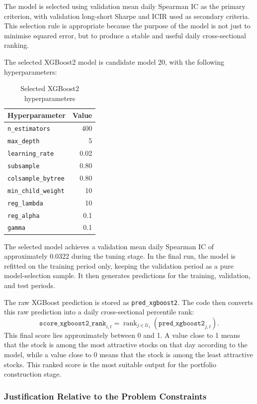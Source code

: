 \documentclass[12pt]{article}
\begin{document}
The model is selected using validation mean daily Spearman IC as the primary criterion, with validation long-short Sharpe and ICIR used as secondary criteria. This selection rule is appropriate because the purpose of the model is not just to minimise squared error, but to produce a stable and useful daily cross-sectional ranking.

The selected XGBoost2 model is candidate model 20, with the following hyperparameters:

\begin{table}[H]
\centering
\caption{Selected XGBoost2 hyperparameters}
\begin{tabular}{lr}
\toprule
Hyperparameter & Value \\
\midrule
\texttt{n\_estimators} & 400 \\
\texttt{max\_depth} & 5 \\
\texttt{learning\_rate} & 0.02 \\
\texttt{subsample} & 0.80 \\
\texttt{colsample\_bytree} & 0.80 \\
\texttt{min\_child\_weight} & 10 \\
\texttt{reg\_lambda} & 10 \\
\texttt{reg\_alpha} & 0.1 \\
\texttt{gamma} & 0.1 \\
\bottomrule
\end{tabular}
\end{table}

The selected model achieves a validation mean daily Spearman IC of approximately 0.0322 during the tuning stage. In the final run, the model is refitted on the training period only, keeping the validation period as a pure model-selection sample. It then generates predictions for the training, validation, and test periods.

The raw XGBoost prediction is stored as \texttt{pred\_xgboost2}. The code then converts this raw prediction into a daily cross-sectional percentile rank:
\[
\texttt{score\_xgboost2\_rank}_{i,t}
=
\operatorname{rank}_{j\in\mathcal{U}_t}
\left(
\texttt{pred\_xgboost2}_{j,t}
\right).
\]
This final score lies approximately between 0 and 1. A value close to 1 means that the stock is among the most attractive stocks on that day according to the model, while a value close to 0 means that the stock is among the least attractive stocks. This ranked score is the most suitable output for the portfolio construction stage.

\subsubsection{Justification Relative to the Problem Constraints}
\end{document}
